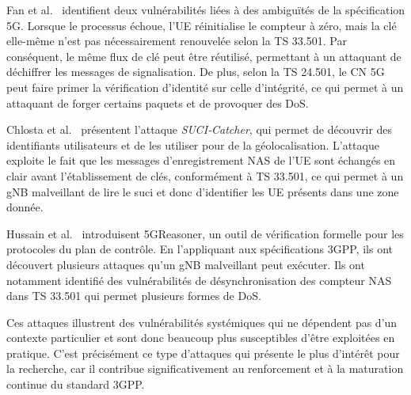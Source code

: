 \documentclass[a4paper,11pt,twoside]{StyleThese}
\begin{document}
Fan et al.~\cite{Fan2025} identifient deux vulnérabilités liées à des ambiguïtés de la spécification 5G. Lorsque le processus  échoue, l’UE réinitialise le compteur à zéro, mais la clé elle-même n’est pas nécessairement renouvelée selon la TS 33.501\cite{ts_33501}. Par conséquent, le même flux de clé peut être réutilisé, permettant à un attaquant de déchiffrer les messages de signalisation. De plus, selon la TS 24.501, le CN 5G peut faire primer la vérification d’identité sur celle d’intégrité, ce qui permet à un attaquant de forger certains paquets et de provoquer des DoS.

Chlosta et al.~\cite{Chlosta2021} présentent l’attaque \textit{SUCI‑Catcher}, qui permet de découvrir des identifiants utilisateurs et de les utiliser pour de la géolocalisation. L’attaque exploite le fait que les messages d'enregistrement NAS de l’UE sont échangés en clair avant l’établissement de clés, conformément à TS 33.501\cite{ts_33501}, ce qui permet à un gNB malveillant de lire le \gls{suci} et donc d'identifier les UE présents dans une zone donnée. 

Hussain et al.~\cite{5Greasoner} introduisent 5GReasoner, un outil de vérification formelle pour les protocoles du plan de contrôle. En l’appliquant aux spécifications 3GPP, ils ont découvert plusieurs attaques qu’un gNB malveillant peut exécuter. Ils ont notamment identifié des vulnérabilités de désynchronisation des compteur NAS dans TS 33.501\cite{ts_33501} qui permet plusieurs formes de DoS.

Ces attaques illustrent des vulnérabilités systémiques qui ne dépendent pas d’un contexte particulier et sont donc beaucoup plus susceptibles d’être exploitées en pratique. C’est précisément ce type d’attaques qui présente le plus d’intérêt pour la recherche, car il contribue significativement au renforcement et à la maturation continue du standard 3GPP.
\end{document}
